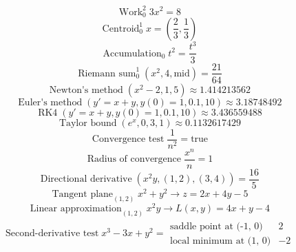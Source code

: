 \documentclass[11pt,a4paper]{article}
\theoremstyle{plain}
\theoremstyle{definition}
\theoremstyle{remark}
\begin{document}
\begin{equation*}
  \operatorname{Work}_{{0}}^{{2}} {3x^2} = 8
\end{equation*}
\begin{equation*}
  \operatorname{Centroid}_{{0}}^{{1}} {x} = \left(\frac{2}{3}, \frac{1}{3}\right)
\end{equation*}
\begin{equation*}
  \operatorname{Accumulation}_{{0}} {t^2} = \frac{t^{3}}{3}
\end{equation*}
\begin{equation*}
  \operatorname{Riemann\ sum}_{{0}}^{{1}} \left( {x^2}, {4}, {\text{mid}} \right) = \frac{21}{64}
\end{equation*}
\begin{equation*}
  \operatorname{Newton's\ method} \left( {x^2 - 2}, {1}, {5} \right) \approx 1.414213562
\end{equation*}
\begin{equation*}
  \operatorname{Euler's\ method} \left( {y' = x + y}, {y(0) = 1}, {0.1}, {10} \right) \approx 3.18748492
\end{equation*}
\begin{equation*}
  \operatorname{RK4} \left( {y' = x + y}, {y(0) = 1}, {0.1}, {10} \right) \approx 3.436559488
\end{equation*}
\begin{equation*}
  \operatorname{Taylor\ bound} \left( {e^x}, {0}, {3}, {1} \right) \approx 0.1132617429
\end{equation*}
\begin{equation*}
  \operatorname{Convergence\ test} {\frac{1}{n^2}} = \text{true}
\end{equation*}
\begin{equation*}
  \operatorname{Radius\ of\ convergence} {\frac{x^n}{n}} = 1
\end{equation*}
\begin{equation*}
  \operatorname{Directional\ derivative} \left( {x^2 y}, {(1, 2)}, {(3, 4)} \right) = \frac{16}{5}
\end{equation*}
\begin{equation*}
  \operatorname{Tangent\ plane}_{{(1, 2)}} {x^2 + y^2} \to z = 2 x + 4 y - 5
\end{equation*}
\begin{equation*}
  \operatorname{Linear\ approximation}_{{(1, 2)}} {x^2 y} \to L\left(x, y\right) = 4 x + y - 4
\end{equation*}
\begin{align*}
  \operatorname{Second-derivative\ test} {x^3 - 3x + y^2} = \begin{array}{ll} \text{saddle point at (-1, 0)} & 2 \\ \text{local minimum at (1, 0)} & -2 \end{array}
\end{align*}
\end{document}
